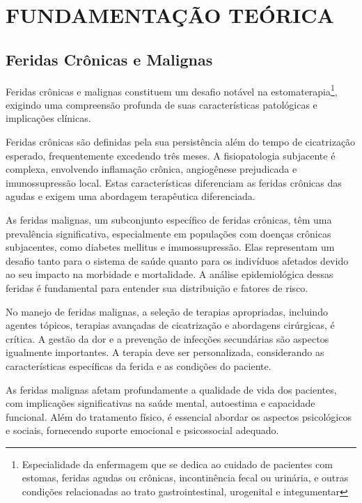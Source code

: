 \section{FUNDAMENTAÇÃO TEÓRICA}

\subsection{Feridas Crônicas e Malignas}

Feridas crônicas e malignas constituem um desafio notável na estomaterapia\footnote{Especialidade da enfermagem que se dedica ao cuidado de pacientes com estomas, feridas agudas ou crônicas, incontinência fecal ou urinária, e outras condições relacionadas ao trato gastrointestinal, urogenital e integumentar}, exigindo uma compreensão profunda de suas características patológicas e implicações clínicas.

Feridas crônicas são definidas pela sua persistência além do tempo de cicatrização esperado, frequentemente excedendo três meses. A fisiopatologia subjacente é complexa, envolvendo inflamação crônica, angiogênese prejudicada e imunossupressão local. Estas características diferenciam as feridas crônicas das agudas e exigem uma abordagem terapêutica diferenciada.

As feridas malignas, um subconjunto específico de feridas crônicas, têm uma prevalência significativa, especialmente em populações com doenças crônicas subjacentes, como diabetes mellitus e imunossupressão. Elas representam um desafio tanto para o sistema de saúde quanto para os indivíduos afetados devido ao seu impacto na morbidade e mortalidade. A análise epidemiológica dessas feridas é fundamental para entender sua distribuição e fatores de risco.

No manejo de feridas malignas, a seleção de terapias apropriadas, incluindo agentes tópicos, terapias avançadas de cicatrização e abordagens cirúrgicas, é crítica. A gestão da dor e a prevenção de infecções secundárias são aspectos igualmente importantes. A terapia deve ser personalizada, considerando as características específicas da ferida e as condições do paciente.

As feridas malignas afetam profundamente a qualidade de vida dos pacientes, com implicações significativas na saúde mental, autoestima e capacidade funcional. Além do tratamento físico, é essencial abordar os aspectos psicológicos e sociais, fornecendo suporte emocional e psicossocial adequado.

